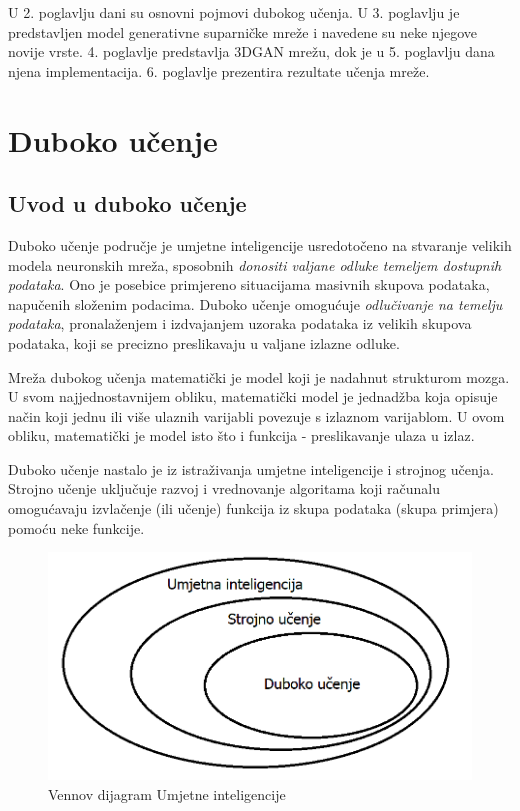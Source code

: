 \documentclass[times, utf8, diplomski]{fer}
\begin{document}
U 2. poglavlju dani su osnovni pojmovi dubokog učenja. U 3. poglavlju je predstavljen model generativne suparničke mreže i navedene su neke njegove novije vrste. 4. poglavlje predstavlja 3DGAN mrežu, dok je u 5. poglavlju dana njena implementacija. 6. poglavlje prezentira rezultate učenja mreže.

\chapter{Duboko učenje}
\section{Uvod u duboko učenje}
Duboko učenje područje je umjetne inteligencije usredotočeno na stvaranje velikih modela neuronskih mreža, sposobnih \textit{donositi valjane odluke temeljem dostupnih podataka}. Ono je posebice primjereno situacijama masivnih skupova podataka, napučenih složenim podacima. Duboko učenje omogućuje \textit{odlučivanje na temelju podataka}, pronalaženjem i izdvajanjem uzoraka podataka iz velikih skupova podataka, koji se precizno preslikavaju u valjane izlazne odluke. \cite{knjiga}

Mreža dubokog učenja matematički je model koji je nadahnut strukturom mozga. U svom najjednostavnijem obliku, matematički model je jednadžba koja opisuje način koji jednu ili više ulaznih varijabli povezuje s izlaznom varijablom. U ovom obliku, matematički je model isto što i funkcija - preslikavanje ulaza u izlaz. \cite{knjiga}

Duboko učenje nastalo je iz istraživanja umjetne inteligencije i strojnog učenja. Strojno učenje uključuje razvoj i vrednovanje algoritama koji računalu omogućavaju izvlačenje (ili učenje) funkcija iz skupa podataka (skupa primjera) pomoću neke funkcije. \cite{knjiga} \\

\begin{figure}
\centering
\includegraphics[scale=0.55]{Duboko učenje.png}   
\caption{Vennov dijagram Umjetne inteligencije}
\end{figure}
\end{document}
